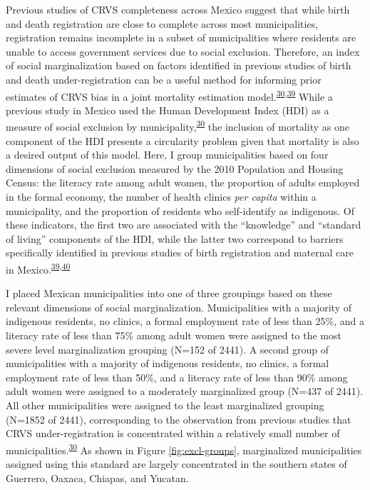 \documentclass[
]{article}
\begin{document}
Previous studies of CRVS completeness across Mexico suggest that while birth and death registration are close to complete across most municipalities, registration remains incomplete in a subset of municipalities where residents are unable to access government services due to social exclusion. Therefore, an index of social marginalization based on factors identified in previous studies of birth and death under-registration can be a useful method for informing prior estimates of CRVS bias in a joint mortality estimation model.\textsuperscript{\protect\hyperlink{ref-Hernandez2012}{30},\protect\hyperlink{ref-Enciso2017}{39}} While a previous study in Mexico used the Human Development Index (HDI) as a measure of social exclusion by municipality,\textsuperscript{\protect\hyperlink{ref-Hernandez2012}{30}} the inclusion of mortality as one component of the HDI presents a circularity problem given that mortality is also a desired output of this model. Here, I group municipalities based on four dimensions of social exclusion measured by the 2010 Population and Housing Census: the literacy rate among adult women, the proportion of adults employed in the formal economy, the number of health clinics \emph{per capita} within a municipality, and the proportion of residents who self-identify as indigenous. Of these indicators, the first two are associated with the ``knowledge'' and ``standard of living'' components of the HDI, while the latter two correspond to barriers specifically identified in previous studies of birth registration and maternal care in Mexico.\textsuperscript{\protect\hyperlink{ref-Enciso2017}{39},\protect\hyperlink{ref-Paulino2019}{40}}

I placed Mexican municipalities into one of three groupings based on these relevant dimensions of social marginalization. Municipalities with a majority of indigenous residents, no clinics, a formal employment rate of less than 25\%, and a literacy rate of less than 75\% among adult women were assigned to the most severe level marginalization grouping (N=152 of 2441). A second group of municipalities with a majority of indigenous residents, no clinics, a formal employment rate of less than 50\%, and a literacy rate of less than 90\% among adult women were assigned to a moderately marginalized group (N=437 of 2441). All other municipalities were assigned to the least marginalized grouping (N=1852 of 2441), corresponding to the observation from previous studies that CRVS under-registration is concentrated within a relatively small number of municipalities.\textsuperscript{\protect\hyperlink{ref-Hernandez2012}{30}} As shown in Figure \ref{fig:excl-groups}, marginalized municipalities assigned using this standard are largely concentrated in the southern states of Guerrero, Oaxaca, Chiapas, and Yucatan.
\end{document}
